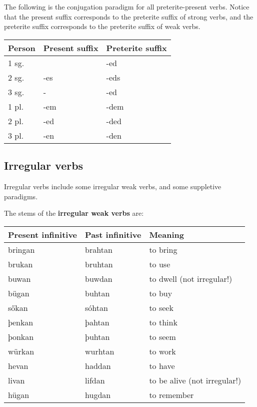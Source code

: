The following is the conjugation paradigm for all preterite-present verbs. Notice that the present suffix corresponds to the preterite suffix of strong verbs, and the preterite suffix corresponds to the preterite suffix of weak verbs.

\begin{center}
\begin{tabular}{lll}
Person & Present suffix & Preterite suffix \\
\hline
1 sg. &     & -ed \\
2 sg. & -es & -eds \\
3 sg. & -   & -ed \\
1 pl. & -em & -dem \\
2 pl. & -ed & -ded \\
3 pl. & -en & -den \\
\end{tabular}
\end{center}

\subsection{Irregular verbs}

Irregular verbs include some irregular weak verbs, and some suppletive paradigms.

The stems of the \textbf{irregular weak verbs} are:

\begin{center}
\begin{tabular}{lll}
Present infinitive & Past infinitive & Meaning \\
\hline
bringan & brahtan & to bring \\
brukan  & bruhtan & to use   \\
buwan   & buwdan  & to dwell (not irregular!) \\
\hline
bügan  & buhtan  & to buy   \\
sőkan  & sóhtan  & to seek  \\
þenkan & þahtan  & to think \\
þonkan & þuhtan  & to seem  \\
würkan & wurhtan & to work  \\
\hline
hevan & haddan & to have \\
livan & lifdan & to be alive (not irregular!) \\
hügan & hugdan & to remember \\
\end{tabular}
\end{center}

